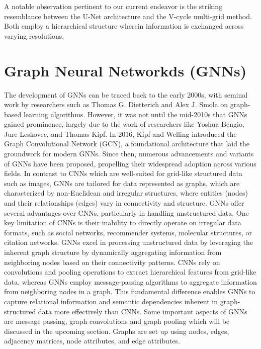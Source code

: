 A notable observation pertinent to our current endeavor is the striking resemblance between the U-Net architecture and the V-cycle multi-grid method. Both employ a hierarchical structure wherein information is exchanged across varying resolutions.
\section{Graph Neural Networkds (GNNs)}
The development of GNNs can be traced back to the early 2000s, with seminal work by researchers such as Thomas G. Dietterich and Alex J. Smola on graph-based learning algorithms. However, it was not until the mid-2010s that GNNs gained prominence, largely due to the work of researchers like Yoshua Bengio, Jure Leskovec, and Thomas Kipf. In 2016, Kipf and Welling introduced the Graph Convolutional Network (GCN), a foundational architecture that laid the groundwork for modern GNNs. Since then, numerous advancements and variants of GNNs have been proposed, propelling their widespread adoption across various fields. In contrast to CNNs which are well-suited for grid-like structured data such as images, GNNs are tailored for data represented as graphs, which are characterized by non-Euclidean and irregular structures, where entities (nodes) and their relationships (edges) vary in connectivity and structure. GNNs offer several advantages over CNNs, particularly in handling unstructured data. One key limitation of CNNs is their inability to directly operate on irregular data formats, such as social networks, recommender systems, molecular structures, or citation networks. GNNs excel in processing unstructured data by leveraging the inherent graph structure by dynamically aggregating information from neighboring nodes based on their connectivity patterns. CNNs rely on convolutions and pooling operations to extract hierarchical features from grid-like data, whereas GNNs employ message-passing algorithms to aggregate information from neighboring nodes in a graph. This fundamental difference enables GNNs to capture relational information and semantic dependencies inherent in graph-structured data more effectively than CNNs. Some important aspects of GNNs are message passing, graph convolutions and graph pooling which will be discussed in the upcoming section. Graphs are set up using nodes, edges, adjacency matrices, node attributes, and edge attributes. 
